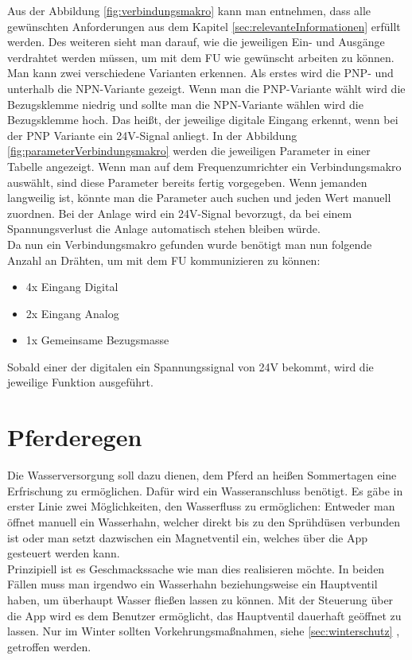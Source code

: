 Aus der Abbildung \ref{fig:verbindungsmakro} kann man entnehmen, dass alle gewünschten Anforderungen aus dem Kapitel \ref{sec:relevanteInformationen} erfüllt werden. Des weiteren sieht man darauf, wie die jeweiligen Ein- und Ausgänge verdrahtet werden müssen, um mit dem \ac{FU} wie gewünscht arbeiten zu können. Man kann zwei verschiedene Varianten erkennen. Als erstes wird die PNP- und unterhalb die NPN-Variante gezeigt. Wenn man die PNP-Variante wählt wird die Bezugsklemme niedrig und sollte man die NPN-Variante wählen wird die Bezugsklemme hoch. Das heißt, der jeweilige digitale Eingang erkennt, wenn bei der PNP Variante ein 24V-Signal anliegt. In der Abbildung \ref{fig:parameterVerbindungsmakro} werden die jeweiligen Parameter in einer Tabelle angezeigt. Wenn man auf dem Frequenzumrichter ein Verbindungsmakro auswählt, sind diese Parameter bereits fertig vorgegeben. Wenn jemanden langweilig ist, könnte man die Parameter auch suchen und jeden Wert manuell zuordnen. Bei der Anlage wird ein 24V-Signal bevorzugt, da bei einem Spannungsverlust die Anlage automatisch stehen bleiben würde. \\

Da nun ein Verbindungsmakro gefunden wurde benötigt man nun folgende Anzahl an Drähten, um mit dem \ac{FU} kommunizieren zu können:

\begin{itemize}
	\item{4x Eingang Digital}
	\item{2x Eingang Analog}
	\item{1x Gemeinsame Bezugsmasse}
\end{itemize}

Sobald einer der digitalen ein Spannungssignal von 24V bekommt, wird die jeweilige Funktion ausgeführt. 



\newpage
\section{Pferderegen}
\label{sec:pferderegen}

Die Wasserversorgung soll dazu dienen, dem Pferd an heißen Sommertagen eine Erfrischung zu ermöglichen. Dafür wird ein Wasseranschluss benötigt. Es gäbe in erster Linie zwei Möglichkeiten, den Wasserfluss zu ermöglichen: Entweder man öffnet manuell ein Wasserhahn, welcher direkt bis zu den Sprühdüsen verbunden ist oder man setzt dazwischen ein Magnetventil ein, welches über die App gesteuert werden kann. \\
Prinzipiell ist es Geschmackssache wie man dies realisieren möchte. In beiden Fällen muss man irgendwo ein Wasserhahn beziehungsweise ein Hauptventil haben, um überhaupt Wasser fließen lassen zu können. 
Mit der Steuerung über die App wird es dem Benutzer ermöglicht, das Hauptventil dauerhaft geöffnet zu lassen. Nur im Winter sollten 
Vorkehrungsmaßnahmen, siehe \ref{sec:winterschutz} , getroffen werden. 

